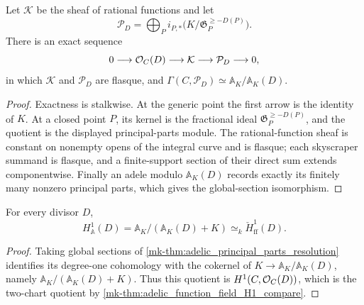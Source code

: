 \begin{proposition}
  \label{mk-thm:adelic_principal_parts_resolution}
  \notready
  Let \(\mathcal K\) be the sheaf of rational functions and let
  \[
    \mathcal P_D=
      \bigoplus_P i_{P,*}
        \bigl(K/\mathfrak G_P^{\ge-D(P)}\bigr).
  \]
  There is an exact sequence
  \[
    0\longrightarrow\mathcal{O}_{C}(D)\longrightarrow\mathcal K
      \longrightarrow\mathcal P_D\longrightarrow0,
  \]
  in which \(\mathcal K\) and \(\mathcal P_D\) are flasque, and
  \(\Gamma(C,\mathcal P_D)\simeq
    \mathbb A_K/\mathbb A_K(D)\).
\end{proposition}
\begin{proof}
  Exactness is stalkwise.  At the generic point the first arrow is the
  identity of \(K\).  At a closed point \(P\), its kernel is the
  fractional ideal \(\mathfrak G_P^{\ge-D(P)}\), and the quotient is the
  displayed principal-parts module.  The rational-function sheaf is
  constant on nonempty opens of the integral curve and is flasque; each
  skyscraper summand is flasque, and a finite-support section of their
  direct sum extends componentwise.  Finally an adele modulo
  \(\mathbb A_K(D)\) records exactly its finitely many nonzero principal
  parts, which gives the global-section isomorphism.
\end{proof}

\begin{proposition}
  \label{mk-thm:adelic_adele_cover_compare}
  \notready
  For every divisor \(D\),
  \[
    H^1_{\mathbb A}(D)
      =\mathbb A_K/(\mathbb A_K(D)+K)
      \simeq_k\check H^1_{\mathrm{ff}}(D).
  \]
\end{proposition}
\begin{proof}
  Taking global sections of
  \ref{mk-thm:adelic_principal_parts_resolution} identifies its degree-one
  cohomology with the cokernel of
  \(K\to\mathbb A_K/\mathbb A_K(D)\), namely
  \(\mathbb A_K/(\mathbb A_K(D)+K)\).  Thus this quotient is
  \(H^1(C,\mathcal{O}_{C}(D))\), which is the two-chart quotient by
  \ref{mk-thm:adelic_function_field_H1_compare}.
\end{proof}

